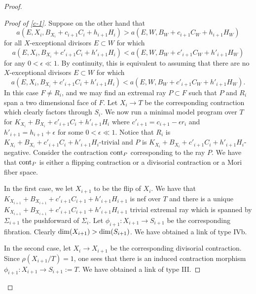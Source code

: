 \documentclass[12pt]{amsart}
\theoremstyle{plain}
\newcommand\R{{\mathbb{R}}}
\begin{document}
\begin{proof}
\begin{proof}[Proof of \ref{c-1}]
Suppose on the other hand that $$a(E,X_i,B_{X_i}+c_{i+1}C_i+h_{i+1}H_i)> 
a(E,W,B_W+c_{i+1}C_W+h_{i+1}H_W)$$ for all 
$X$-exceptional divisors $E\subset W$ for which $$a(E,X_i,B_{X_i}+c'_{i+1}C_i+h'_{i+1}H_i)< 
a(E,W,B_W+c'_{i+1}C_W+h'_{i+1}H_W)$$ for any $0<\epsilon \ll 1$. 
By continuity, this is equivalent to assuming that there are no $X$-exceptional divisors $E\subset W$ for which $$a(E,X_i,B_{X_i}+c'_{i+1}C_i+h'_{i+1}H_i)< 
a(E,W,B_W+c'_{i+1}C_W+h'_{i+1}H_W).$$
In this case
$F\ne R_i$, and we may find an extremal ray $P\subset F$ such that 
$P$ and $R_i$ span a two dimensional face of $F$.
Let $X_i\to T$ be the corresponding contraction which clearly factors through
$S_i$. We now run a minimal model program over $T$ for 
$K_{X_i}+B_{X_i}+c'_{i+1}C_i+h'_{i+1}H_i$
where $c'_{i+1}=c_{i+1}-\epsilon r_i$ and $h'_{i+1}=h_{i+1}+\epsilon$
for some $0< \epsilon \ll 1$. Notice that $R_i$ is $K_{X_i}+B_{X_i}+c'_{i+1}
C_i+h'_{i+1}H_i$-trivial and $P$ is $K_{X_i}+B_{X_i}+c'_{i+1}C_i+
h'_{i+1}H_i$-negative. Consider the contraction ${\rm cont }_P$
corresponding to the ray $P$. We have that ${\rm cont }_P$ is either a flipping contraction or a divisorial contraction or a Mori fiber space.


In the first case, we let $X_{i+1}$ to be the flip
of $X_i$. We have that $K_{X_{i+1}}+B_{X_{i+1}}+c'_{i+1}C_{i+1}+h'_{i+1}
H_{i+1}$ is nef over $T$ and there is a unique $K_{X_{i+1}}+B_{X_{i+1}}+
c'_{i+1}C_{i+1}+h'_{i+1}H_{i+1}$ trivial extremal ray which is spanned 
by $\Sigma _{i+1}$ the pushforward of $\Sigma _i$. Let $\phi _{i+1}:X_{i+1}
\to S_{i+1}$ be the corresponding fibration. Clearly ${\rm dim}(X_{i+1})>
{\rm dim}(S_{i+1})$. We have obtained a link of type IVb.


In the second case, let $X_i\to X_{i+1}$ be the corresponding divisorial contraction. Since $\rho (X_{i+1}/T)=1$, one sees that there is an induced
contraction morphism $\phi _{i+1}:X_{i+1}\to S_{i+1}:=T$.
We have obtained a link of type III.


\end{proof}
\end{proof}
\end{document}
